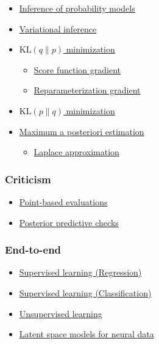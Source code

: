 \begin{itemize}
  \item \href{tut_inference.html}{Inference of probability models}
  \item \href{tut_variational_inference.html}{Variational inference}
  \item \href{tut_KLqp.html}{$\text{KL}(q\|p)$ minimization}
  \begin{itemize}
    \item \href{tut_KLqp_score.html}{Score function gradient}
    \item \href{tut_KLqp_reparam.html}{Reparameterization gradient}
  \end{itemize}
  \item \href{tut_KLpq.html}{$\text{KL}(p\|q)$ minimization}
  \item \href{tut_MAP.html}{Maximum a posteriori estimation}
  \begin{itemize}
    \item \href{tut_MAP_Laplace.html}{Laplace approximation}
  \end{itemize}
\end{itemize}

\subsubsection{Criticism}

\begin{itemize}
  \item \href{tut_point_eval.html}{Point-based evaluations}
  \item \href{tut_PPC.html}{Posterior predictive checks}
\end{itemize}

\subsubsection{End-to-end}

\begin{itemize}
  \item \href{tut_supervised_regression.html}{Supervised learning (Regression)}
  \item \href{tut_supervised_classification.html}{Supervised learning (Classification)}
  \item \href{tut_unsupervised.html}{Unsupervised learning}
  \item \href{tut_latent_space_models.html}{Latent space models for neural data}
\end{itemize}
